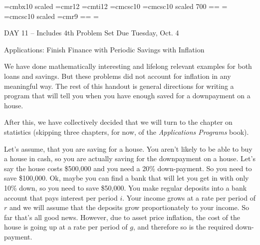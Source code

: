 
\def\folio{\ifnum\pageno>0 \number\pageno \else
   \ifnum\pageno<0 \romannumeral-\pageno \else\fi\fi}

\font\largebf=cmbx10  scaled 
\font\largerm=cmr12
\font\largeit=cmti12
\font\tensc=cmcsc10
\font\sevensc=cmcsc10 scaled 700
\newfam\scfam \def\sc{\fam\scfam\tensc}
\textfont\scfam=\tensc \scriptfont\scfam=\sevensc
\scriptscriptfont\scfam=\sevensc
\font\largesc=cmcsc10 scaled 
\font\ninerm=cmr9
\newfam\srfam \def\sr{\fam\srfam\ninerm}
\textfont\srfam=\ninerm \scriptfont\srfam=\sevenrm
\scriptscriptfont\srfam=\fiverm




\null\vskip36pt

\centerline{\largerm DAY 11 -- Includes 4th Problem Set Due Tuesday, Oct. 4}
\nobreak\bigskip

\centerline{\largeit Applications: Finish Finance with Periodic Savings with Inflation}
\nobreak\bigskip

\nobreak\bigskip

\noindent  We have done mathematically interesting and lifelong relevant examples for both loans and savings. But these problems did not account for inflation in any meaningful way. The rest of this handout is general directions for writing a program that will tell you when you have enough saved for a downpayment on a house.

After this, we have collectively decided that we will turn to the chapter on statistics (skipping three chapters, for now, of the {\it Applications Programs} book).

\bigskip

\nobreak\bigskip

\nobreak\bigskip

\noindent Let's assume, that you are saving for a house. You aren't likely to be able to buy a house in cash, so you are actually saving for the downpayment on a house. Let's say the house costs \$500,000 and you need a 20\% down-payment. So you need to save \$100,000. Ok, maybe you can find a bank that will let you get in with only 10\% down, so you need to save \$50,000. You make regular deposits into a bank account that pays interest per period $i$. Your income grows at a rate per period of $r$ and we will assume that the deposits grow proportionately to your income. So far that's all good news. However, due to asset price inflation, the cost of the house is going up at a rate per period of $g$, and therefore so is the required down-payment.

